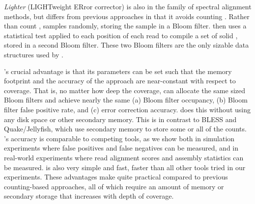 \documentclass[10pt]{article}
\begin{document}
\emph{Lighter} (LIGHTweight ERror corrector) is also in the family of spectral alignment methods, but differs from previous approaches in that it avoids counting \kmers.
Rather than count \kmers, \tool samples \kmers randomly, storing the sample in a Bloom filter.
\tool then uses a statistical test applied to each position of each read to compile a set of solid \kmers, stored in a second Bloom filter.
These two Bloom filters are the only sizable data structures used by \tool.

\tool's crucial advantage is that its parameters can be set such that the memory footprint and the accuracy of the approach are near-constant with respect to coverage.
That is, no matter how deep the coverage, \tool can allocate the same sized Bloom filters and achieve nearly the same (a) Bloom filter occupancy, (b) Bloom filter false positive rate, and (c) error correction accuracy.
\tool does this without using any disk space or other secondary memory.
This is in contrast to BLESS and Quake/Jellyfish, which use secondary memory to store some or all of the \kmer counts.
\tool's accuracy is comparable to competing tools, as we show both in simulation experiments where false positives and false negatives can be measured, and in real-world experiments where read alignment scores and assembly statistics can be measured.  
\tool is also very simple and fast, faster than all other tools tried in our experiments.
These advantages make \tool quite practical compared to previous counting-based approaches, all of which require an amount of memory or secondary storage that increases with depth of coverage.




\end{document}
